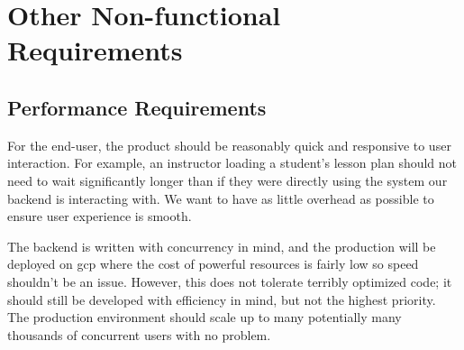 
\section{Other Non-functional Requirements}\label{sec:non-functional-requirements}
    \subsection{Performance Requirements}\label{sec:performance-requirements}
        For the end-user, the product should be reasonably quick and responsive to user interaction. For example, an instructor loading a student's lesson plan should not need to wait significantly longer than if they were directly using the system our backend is interacting with. We want to have as little overhead as possible to ensure user experience is smooth.
        \par The backend is written with concurrency in mind, and the production will be deployed on \gls{gcp} where the cost of powerful resources is fairly low so speed shouldn't be an issue. However, this does not tolerate terribly optimized code; it should still be developed with efficiency in mind, but not the highest priority. The production environment should scale up to many potentially many thousands of concurrent users with no problem.
